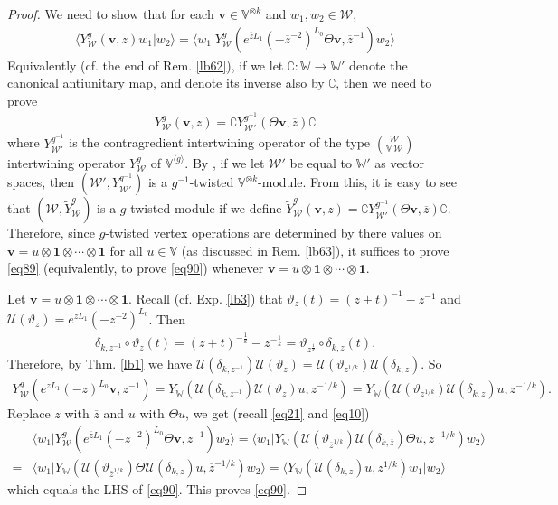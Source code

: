 \documentclass[11pt,b5paper,notitlepage]{article}
\theoremstyle{definition}
\theoremstyle{plain}
\newcommand{\mc}{\mathcal}
\newcommand{\wtd}{\widetilde}
\newcommand{\ovl}{\overline}
\newcommand{\id}{\mathbf{1}}
\newcommand{\bk}[1]{\langle {#1}\rangle}
\newcommand{\Co}{\complement}
\newcommand{\Vbb}{\mathbb V}
\newcommand{\Wbb}{\mathbb W}
\newcommand{\vbf}{\mathbf v}
\numberwithin{equation}{section}
\begin{document}
\begin{proof}
We need to show that for each $\vbf\in\Vbb^{\otimes k}$ and $w_1,w_2\in\mc W$,
\begin{align}
\bk{Y_{\mc W}^g(\vbf,z)w_1|w_2}=\bk{w_1|Y_{\mc W}^g(e^{\ovl zL_1}(-\ovl z^{-2})^{L_0}\Theta \vbf,\ovl z^{-1})w_2}  \label{eq90}
\end{align}
Equivalently (cf. the end of Rem. \ref{lb62}), if we let $\Co:\Wbb\rightarrow\Wbb'$ denote the canonical antiunitary map, and denote its inverse also by $\Co$, then we need to prove
\begin{align}
Y_{\mc W}^g(\vbf,z)=\Co Y_{\mc W'}^{g^{-1}}(\Theta \vbf,\ovl z)\Co   \label{eq89}
\end{align}
where $Y_{\mc W'}^{g^{-1}}$ is the contragredient intertwining operator of the type $\mc W\choose\Vbb~\mc W$ intertwining operator $Y_{\mc W}^g$ of $\Vbb^{\bk g}$. By \cite[Prop. 3.3]{Hua18}, if we let $\mc W'$ be equal to $\Wbb'$ as vector spaces, then $(\mc W',Y_{\mc W'}^{g^{-1}})$ is a $g^{-1}$-twisted $\Vbb^{\otimes k}$-module. From this, it is easy to see that $(\mc W,\wtd Y_{\mc W}^g)$ is a $g$-twisted module if we define $\wtd Y_{\mc W}^g(\vbf,z)= \Co Y_{\mc W'}^{g^{-1}}(\Theta \vbf,\ovl z)\Co$. Therefore, since $g$-twisted vertex operations are determined by there values on $\vbf=u\otimes\id\otimes\cdots\otimes\id$ for all $u\in\Vbb$ (as discussed in Rem. \ref{lb63}), it suffices to prove \eqref{eq89} (equivalently, to prove \eqref{eq90}) whenever $\vbf=u\otimes\id\otimes\cdots\otimes\id$.


Let $\vbf=u\otimes\id\otimes\cdots\otimes\id$. Recall (cf. Exp. \ref{lb3}) that $\vartheta_z(t)=(z+t)^{-1}-z^{-1}$ and $\mc U(\vartheta_z)=e^{zL_1}(-z^{-2})^{L_0}$. Then
\begin{align*}
\delta_{k,z^{-1}}\circ\vartheta_z(t)=(z+t)^{-\frac 1k}-z^{-\frac 1k}=\vartheta_{z^{\frac 1k}}\circ\delta_{k,z}(t).
\end{align*}
Therefore, by Thm. \ref{lb1} we have $\mc U(\delta_{k,z^{-1}})\mc U(\vartheta_z)=\mc U(\vartheta_{z^{1/k}})\mc U(\delta_{k,z})$. So
\begin{align*}
Y_{\mc W}^g(e^{zL_1}(-z)^{L_0} \vbf, z^{-1})=Y_\Wbb(\mc U(\delta_{k,z^{-1}})\mc U(\vartheta_z)u,z^{-1/k})=Y_\Wbb(\mc U(\vartheta_{z^{1/k}})\mc U(\delta_{k,z})u,z^{-1/k}).
\end{align*}
Replace $z$ with $\ovl z$ and $u$ with $\Theta u$, we get (recall \eqref{eq21} and \eqref{eq10})
\begin{align*}
&\bk{w_1|Y_{\mc W}^g(e^{\ovl zL_1}(-\ovl z^{-2})^{L_0}\Theta \vbf,\ovl z^{-1})w_2}=\bk{w_1|Y_\Wbb(\mc U(\vartheta_{\ovl z^{1/k}})\mc U(\delta_{k,\ovl z})\Theta u,\ovl z^{-1/k})w_2}\\
=&\bk{w_1|Y_\Wbb(\mc U(\vartheta_{\ovl z^{1/k}})\Theta\mc U(\delta_{k,z}) u,\ovl z^{-1/k})w_2}=\bk{Y_\Wbb(\mc U(\delta_{k,z})u,z^{1/k})w_1|w_2}
\end{align*}
which equals the LHS of \eqref{eq90}. This proves \eqref{eq90}.
\end{proof}
\end{document}
